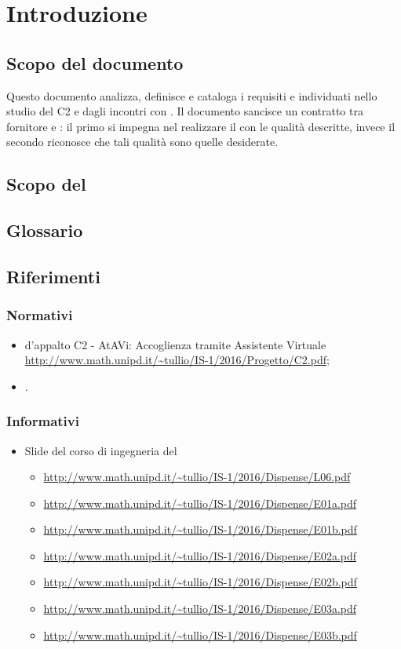 \section{Introduzione}
 \subsection{Scopo del documento}
 Questo documento analizza, definisce e cataloga i requisiti e  individuati nello studio del  C2 e dagli incontri con \PROPONENTE. 
 Il documento sancisce un contratto tra fornitore e : il primo si impegna nel realizzare il  con le qualità descritte, invece il secondo riconosce che tali qualità sono quelle desiderate. 
 \subsection{Scopo del }
 \SCOPO
 \subsection{Glossario}
 \GLOSSARIO
 \subsection{Riferimenti}
  \subsubsection{Normativi}
  \begin{itemize}
  	\item {} d'appalto C2 - AtAVi: Accoglienza tramite Assistente Virtuale \\
  	\url{http://www.math.unipd.it/~tullio/IS-1/2016/Progetto/C2.pdf};
    \item \NPdoc.
  \end{itemize}
  \subsubsection{Informativi}
    \begin{itemize}
    	\item Slide del corso di ingegneria del 
    	\begin{itemize}
    		\item \url{http://www.math.unipd.it/~tullio/IS-1/2016/Dispense/L06.pdf}
    		\item \url{http://www.math.unipd.it/~tullio/IS-1/2016/Dispense/E01a.pdf}
    		\item \url{http://www.math.unipd.it/~tullio/IS-1/2016/Dispense/E01b.pdf}
    		\item \url{http://www.math.unipd.it/~tullio/IS-1/2016/Dispense/E02a.pdf}
    		\item \url{http://www.math.unipd.it/~tullio/IS-1/2016/Dispense/E02b.pdf}
    		\item \url{http://www.math.unipd.it/~tullio/IS-1/2016/Dispense/E03a.pdf}
    		\item \url{http://www.math.unipd.it/~tullio/IS-1/2016/Dispense/E03b.pdf}
    	\end{itemize}
    \end{itemize}